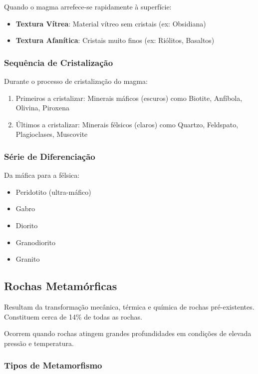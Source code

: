 \documentclass[12pt,a4paper,twoside]{book}
\begin{document}
Quando o magma arrefece-se rapidamente à superfície:
\begin{itemize}
    \item \textbf{Textura Vítrea}: Material vítreo sem cristais (ex: Obsidiana)
    \item \textbf{Textura Afanítica}: Cristais muito finos (ex: Riólitos, Basaltos)
\end{itemize}

\subsubsection{Sequência de Cristalização}

Durante o processo de cristalização do magma:
\begin{enumerate}
    \item Primeiros a cristalizar: Minerais máficos (escuros) como Biotite, Anfíbola, Olivina, Piroxena
    \item Últimos a cristalizar: Minerais félsicos (claros) como Quartzo, Feldspato, Plagioclases, Muscovite
\end{enumerate}

\subsubsection{Série de Diferenciação}

Da máfica para a félsica:
\begin{itemize}
    \item Peridotito (ultra-máfico)
    \item Gabro
    \item Diorito
    \item Granodiorito
    \item Granito
\end{itemize}

\subsection{Rochas Metamórficas}

Resultam da transformação mecânica, térmica e química de rochas pré-existentes. Constituem cerca 
de 14\% de todas as rochas.

Ocorrem quando rochas atingem grandes profundidades em condições de elevada pressão e temperatura.

\subsubsection{Tipos de Metamorfismo}
\end{document}
